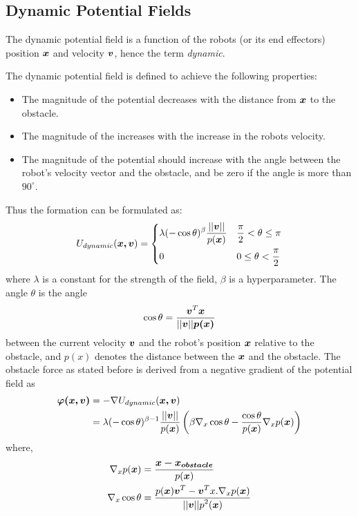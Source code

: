 \subsection{Dynamic Potential Fields}
The dynamic potential field is a function of the robots (or its end effectors) position $\boldsymbol{x}$ 
and velocity $\boldsymbol{v}$, hence the term \textit{dynamic}.

The dynamic potential field is defined to achieve the following properties:
\begin{itemize}
    \item The magnitude of the potential decreases with the distance from $\boldsymbol{x}$ to the obstacle.
    \item The magnitude of the increases with the increase in the robots velocity.
    \item The magnitude of the potential should increase with the 
    angle between the robot's velocity vector and the obstacle, and be zero if the angle is more than $90^{\circ}$.
\end{itemize}

Thus the formation can be formulated as:
\begin{equation}
    U_{dynamic}(\boldsymbol{x,v}) = 
    \begin{dcases}
        \lambda (- \cos \theta )^{\beta} \frac{\displaystyle ||\boldsymbol{v}||}{\displaystyle p(\boldsymbol{x})}  & \frac{\pi}{2} < \theta \leq \pi \\
        0 & 0 \leq \theta < \frac{\pi}{2}
    \end{dcases}
\end{equation}
where $\lambda$ is a constant for the strength of the field, $\beta$ is a hyperparameter. The angle $\theta$ is the angle
\begin{equation}
    \cos \theta  = \frac{\displaystyle \boldsymbol{v}^T \boldsymbol{x}}{\displaystyle ||\boldsymbol{v}|| \boldsymbol{p(x)}}
\end{equation}
between the current velocity $\boldsymbol{v}$ and the robot's position $\boldsymbol{x}$ relative to the obstacle, and $p(x)$ denotes 
the distance between the $\boldsymbol{x}$ and the obstacle.
The obstacle force as stated before is derived from a negative gradient of the potential field as
\begin{align}
    \boldsymbol{\varphi(x,v)} &= -\nabla U_{dynamic}(\boldsymbol{x,v}) \\  
    &=\lambda (- \cos \theta)^{\beta -1} \frac{\displaystyle ||\boldsymbol{v}||}{\displaystyle p(\boldsymbol{x})} 
    \left( \beta \nabla_x \cos \theta - \frac{\displaystyle \cos \theta}{\displaystyle p(\boldsymbol{x})} \nabla_x p(\boldsymbol{x}) \right)\label{eq:dynamicForceField}
\end{align}
where,
\begin{align}
    \nabla_x p(\boldsymbol{x}) &= \frac{\displaystyle \boldsymbol{x - x_{obstacle}}}{\displaystyle p(\boldsymbol{x})} \\
    \nabla_x \cos \theta &= \frac{\displaystyle  p(\boldsymbol{x}) \boldsymbol{v}^T - \boldsymbol{v}^Tx .\nabla_x p(\boldsymbol{x}) }{\displaystyle ||\boldsymbol{v}|| p^2(\boldsymbol{x})}
\end{align}

